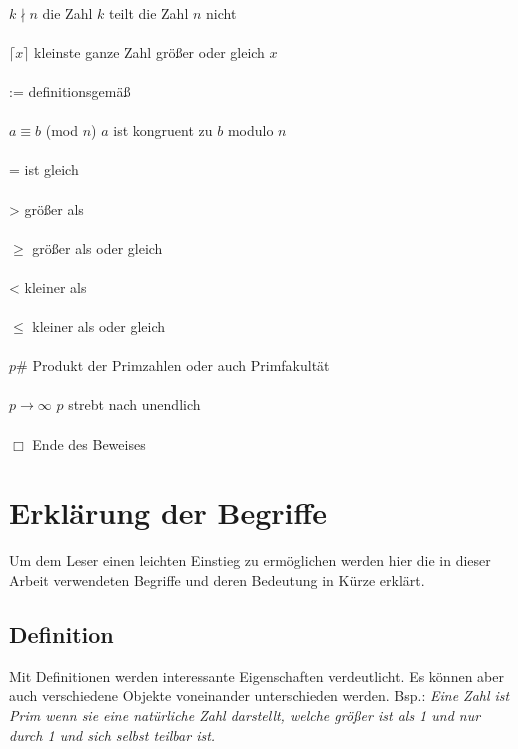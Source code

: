 \documentclass[12pt,a4paper]{article}
\theoremstyle{definition}
\begin{document}
\begin{tabbing}
\\$k \nmid n$             \> die Zahl $k$ teilt die Zahl $n$ nicht\\
\\$\lceil{x}\rceil$       \> kleinste ganze Zahl größer oder gleich $x$\\
\\:=                      \> definitionsgemäß\\
\\$a\equiv b$ (mod $n$)   \> $a$ ist kongruent zu $b$ modulo $n$\\
\\=                       \> ist gleich\\
\\>                       \> größer als\\
\\$\geq$                  \> größer als oder gleich\\
\\<                       \> kleiner als\\
\\$\leq$                  \> kleiner als oder gleich\\
\\$p\#$                   \> Produkt der Primzahlen oder auch Primfakultät\\
\\$p \to \infty$          \> $p$ strebt nach unendlich\\
\\$\Box$                  \> Ende des Beweises

\end{tabbing}
\newpage

\section*{Erklärung der Begriffe}
Um dem Leser einen leichten Einstieg zu ermöglichen werden hier die in dieser Arbeit verwendeten Begriffe und deren Bedeutung in Kürze erklärt.

\subsection*{Definition}
Mit Definitionen werden interessante Eigenschaften verdeutlicht.
Es können aber auch verschiedene Objekte voneinander unterschieden werden.\newline
Bsp.: \textit{Eine Zahl ist Prim wenn sie eine natürliche Zahl darstellt, welche größer ist als 1 und nur durch 1 und sich selbst teilbar ist.}
\end{document}
